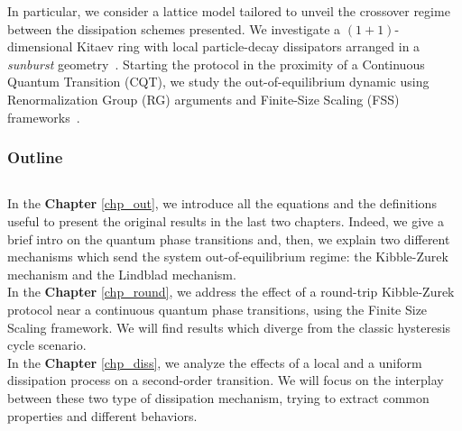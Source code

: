 In particular, we consider a lattice model tailored to unveil the crossover regime between the  dissipation schemes presented. We investigate a $(1+1)$-dimensional Kitaev ring with local particle-decay dissipators arranged in a \textit{sunburst} geometry~\cite{FRV-staticsunburst, FRV-timesunburst, MS-2022-sunburstquench}.
Starting the protocol in the proximity of a Continuous Quantum Transition (CQT), we study the out-of-equilibrium dynamic using Renormalization Group (RG) arguments and Finite-Size Scaling (FSS) frameworks~\cite{C-1996-ScalingandRG, RV-2021-coherentanddissipativedynamicsreview}.





\subsubsection{Outline}
$ $

In the \textbf{Chapter} \ref{chp_out}, we introduce all the equations and the definitions
useful to present the original results in the last two chapters. Indeed, we give a brief
intro on the quantum phase transitions and, then, we explain two different mechanisms
which send the system out-of-equilibrium regime: the Kibble-Zurek mechanism and the
Lindblad mechanism.\\

In the \textbf{Chapter} \ref{chp_round}, we address the effect of a round-trip Kibble-Zurek
protocol near a continuous quantum phase transitions, using the Finite Size Scaling 
framework. We will find results which diverge from the classic hysteresis cycle scenario.\\

In the \textbf{Chapter} \ref{chp_diss}, we analyze the effects of a local and a uniform
dissipation process on a second-order transition. We will focus on the interplay between
these two type of dissipation mechanism, trying to extract common properties and different
behaviors.




